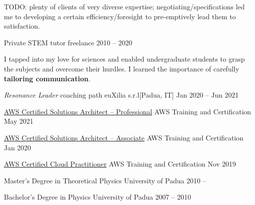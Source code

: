 \documentclass[9pt]{scrartcl}
\newlength{\Pad}\setlength{\Pad}{14.562pt} %
\begin{document}
TODO: plenty of clients of very diverse expertise; negotiating/specifications led me to developing a certain efficiency/foresight to pre-emptively lead them to satisfaction.


\Event
  {Private STEM tutor}
  {freelance}
  {2010 -- 2020}

I tapped into my love for sciences
and enabled undergraduate students
to grasp the subjects and overcome their hurdles.
I learned the importance of carefully \textbf{tailoring communication}.



\SimpleEvent
  {\emph{Resonance Leader} coaching path}
  {euXilia s.r.l}[Padua, IT]
  {Jan 2020 -- Jun 2021}

\SimpleEvent
  {\href{https://www.credly.com/badges/37aaaf27-3a2e-436d-9195-db4f46eb222e/public_url}
  {%
   AWS Certified Solutions Architect -- Professional}}
  {AWS Training and Certification}
  {May 2021}

\SimpleEvent
  {\href{https://www.credly.com/badges/d092afab-f194-4074-ade6-78728c854faa/public_url}
  {%
   AWS Certified Solutions Architect -- Associate}}
  {AWS Training and Certification}
  {Jan 2020}

\SimpleEvent
  {\href{https://www.credly.com/badges/d268e963-65ba-462b-a835-f65a7baccccd/public_url}
  {%
   AWS Certified Cloud Practitioner}}
  {AWS Training and Certification}
  {Nov 2019}

\SimpleEvent
  {Master's Degree in Theoretical Physics}
  {University of Padua}
  {2010 -- }


\SimpleEvent
  {Bachelor's Degree in Physics}
  {University of Padua}
  {2007 -- 2010}

\end{document}
